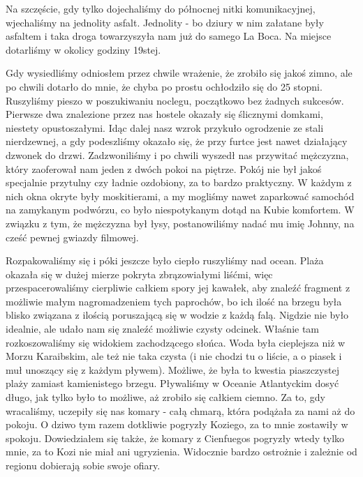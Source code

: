 \noindent Na szczęście, gdy tylko dojechaliśmy do północnej nitki komunikacyjnej, wjechaliśmy na jednolity asfalt.
Jednolity - bo dziury w nim załatane były asfaltem i taka droga towarzyszyła nam już do samego La Boca.
Na miejsce dotarliśmy w okolicy godziny 19stej.
\par Gdy wysiedliśmy odniosłem przez chwile wrażenie, że zrobiło się jakoś zimno, ale po chwili dotarło do mnie, że chyba po prostu ochłodziło się do 25 stopni.
Ruszyliśmy pieszo w poszukiwaniu noclegu, początkowo bez żadnych sukcesów.
Pierwsze dwa znalezione przez nas hostele okazały się ślicznymi domkami, niestety opustoszałymi.
Idąc dalej nasz wzrok przykuło ogrodzenie ze stali nierdzewnej, a gdy podeszliśmy okazało się, że przy furtce jest nawet działający dzwonek do drzwi.
Zadzwoniliśmy i po chwili wyszedł nas przywitać mężczyzna, który zaoferował nam jeden z dwóch pokoi na piętrze.
Pokój nie był jakoś specjalnie przytulny czy ładnie ozdobiony, za to bardzo praktyczny.
W każdym z nich okna okryte były moskitierami, a my mogliśmy nawet zaparkować samochód na zamykanym podwórzu, co było niespotykanym dotąd na Kubie komfortem.
W związku z tym, że mężczyzna był łysy, postanowiliśmy nadać mu imię Johnny, na cześć pewnej gwiazdy filmowej.
\par Rozpakowaliśmy się i póki jeszcze było ciepło ruszyliśmy nad ocean.
Plaża okazała się w dużej mierze pokryta zbrązowiałymi liśćmi, więc przespacerowaliśmy cierpliwie całkiem spory jej kawałek, aby znaleźć fragment z możliwie małym nagromadzeniem tych paprochów, bo ich ilość na brzegu była blisko związana z ilością poruszającą się w wodzie z każdą falą.
Nigdzie nie było idealnie, ale udało nam się znaleźć możliwie czysty odcinek.
Właśnie tam rozkoszowaliśmy się widokiem zachodzącego słońca.
Woda była cieplejsza niż w Morzu Karaibskim, ale też nie taka czysta (i nie chodzi tu o liście, a o piasek i muł unoszący się z każdym pływem).
Możliwe, że była to kwestia piaszczystej plaży zamiast kamienistego brzegu.
Pływaliśmy w Oceanie Atlantyckim dosyć długo, jak tylko było to możliwe, aż zrobiło się całkiem ciemno.
Za to, gdy wracaliśmy, uczepiły się nas komary - całą chmarą, która podążała za nami aż do pokoju.
O dziwo tym razem dotkliwie pogryzły Koziego, za to mnie zostawiły w spokoju.
Dowiedziałem się także, że komary z Cienfuegos pogryzły wtedy tylko mnie, za to Kozi nie miał ani ugryzienia.
Widocznie bardzo ostrożnie i zależnie od regionu dobierają sobie swoje ofiary.